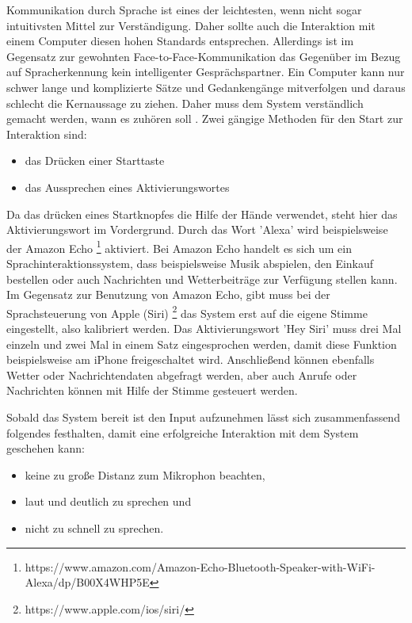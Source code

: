 \newline \newline
Kommunikation durch Sprache ist eines der leichtesten, wenn nicht sogar intuitivsten Mittel zur Verständigung. Daher sollte auch die Interaktion mit einem Computer diesen hohen Standards entsprechen. Allerdings ist im Gegensatz zur gewohnten Face-to-Face-Kommunikation das Gegenüber im Bezug auf Spracherkennung kein intelligenter Gesprächspartner. Ein Computer kann nur schwer lange und komplizierte Sätze und Gedankengänge mitverfolgen und daraus schlecht die Kernaussage zu ziehen. Daher muss dem System verständlich gemacht werden, wann es zuhören soll \cite{SpeechInteraction}.
Zwei gängige Methoden für den Start zur Interaktion sind:
\begin{itemize}
      \item das Drücken einer Starttaste
      \item das Aussprechen eines Aktivierungswortes
\end{itemize}
Da das drücken eines Startknopfes die Hilfe der Hände verwendet, steht hier das Aktivierungswort im Vordergrund.
Durch das Wort 'Alexa' wird beispielsweise der Amazon Echo %
\footnote{https://www.amazon.com/Amazon-Echo-Bluetooth-Speaker-with-WiFi-Alexa/dp/B00X4WHP5E}
%
aktiviert. Bei Amazon Echo handelt es sich um
ein Sprachinteraktionssystem, dass beispielsweise Musik abspielen, den Einkauf bestellen oder auch Nachrichten und Wetterbeiträge zur Verfügung stellen kann.
Im Gegensatz zur Benutzung von Amazon Echo, gibt muss bei der Sprachsteuerung von Apple (Siri)%
\footnote{https://www.apple.com/ios/siri/}
%
 das System erst auf die eigene Stimme eingestellt, also kalibriert werden. Das Aktivierungswort 'Hey Siri' muss drei Mal einzeln und zwei Mal in einem Satz eingesprochen werden, damit diese Funktion beispielsweise am iPhone freigeschaltet wird. Anschließend können ebenfalls Wetter oder Nachrichtendaten abgefragt werden, aber auch Anrufe oder Nachrichten können mit Hilfe der Stimme gesteuert werden. 
 
Sobald das System bereit ist den Input aufzunehmen lässt sich zusammenfassend folgendes festhalten, damit eine erfolgreiche Interaktion mit dem System geschehen kann:
\begin{itemize}
      \item keine zu große Distanz zum Mikrophon beachten,
      \item laut und deutlich zu sprechen und
			\item nicht zu schnell zu sprechen.
\end{itemize}

